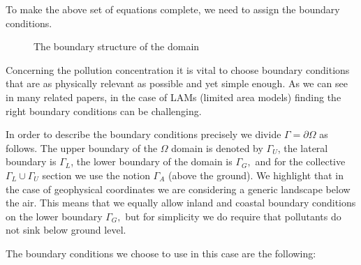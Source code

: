 \documentclass[12pt]{report}
\numberwithin{theorem}{chapter}
\numberwithin{corollary}{chapter}
\numberwithin{lemma}{chapter}
\numberwithin{remark}{chapter}
\numberwithin{definition}{chapter}
\numberwithin{prop}{chapter}
\begin{document}
To make the above set of equations complete, we need to assign the boundary conditions.

\begin{figure}[!h]
  \centering
  \caption{The boundary structure of the domain}
  \label{fig:boundarystructuregraph}
\end{figure}

Concerning the pollution concentration it is vital to choose boundary conditions that are as physically relevant as possible and yet simple enough. As we can see in many related papers, in the case of LAMs (limited area models) finding the right boundary conditions can be challenging.

In order to describe the boundary conditions precisely we divide $\Gamma = \partial \Omega$ as follows. The upper boundary of the $\Omega$ domain is denoted by $\Gamma_U$, the lateral boundary is $\Gamma_L$, the lower boundary of the domain is $\Gamma_G,$ and for the collective $\Gamma_L \cup \Gamma_U$ section we use the notion $\Gamma_A$ (above the ground).
We highlight that in the case of geophysical coordinates we are considering a generic landscape below the air. This means that we equally allow inland and coastal boundary conditions on the lower boundary $\Gamma_G,$ but for simplicity we do require that pollutants do not sink below ground level.

The boundary conditions we choose to use in this case are the following:
\end{document}

